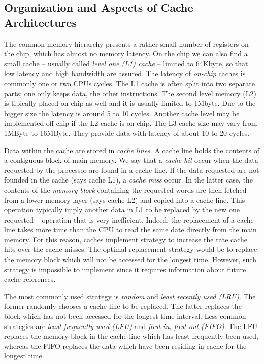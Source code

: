 \subsection{Organization and Aspects of Cache Architectures}
The common memory hierarchy presents a rather small number of registers on the chip, which has almost no memory latency. On the chip we can also find a small cache -- usually called \textit{level one (L1) cache} -- limited to 64Kbyte, so that low latency and high bandwidth are assured. The latency of \textit{on-chip} caches is commonly one or two CPUs cycles. The L1 cache is often split into two separate parts; one only keeps data, the other instructions. The second level memory (L2) is tipically placed on-chip as well and it is usually limited to 1Mbyte. Due to the bigger size the  latency is around 5 to 10 cycles. Another cache level may be implemented off-chip if the L2 cache is on-chip. The L3 cache size may vary from 1MByte to 16MByte. They provide data with latency of about 10 to 20 cycles.

Data within the cache are stored in \textit{cache lines}. A cache line holds the contents of a contiguous block of main memory. We say that a \textit{cache hit} occur when the data requested by the processor are found in a cache line. If the data requested are not founded in the cache (says cache L1), a \textit{cache miss} occur. In the latter case, the contents of the \textit{memory block} containing the requested words are then fetched from a lower memory layer (says cache L2) and copied into a cache line. This operation typically imply another data in L1 to be replaced by the new one requested -- operation that is very inefficient. Indeed, the replacement of a cache line takes more time than the CPU to read the same date directly from the main memory. For this reason, caches implement strategy to increase the rate cache hits  over the cache misses. The optimal replacement strategy would be to replace the memory block which will not be accessed for the longest time. However, such strategy is impossible to implement since it requires information about future cache references. 

The most commonly used strategy is \textit{random} and \textit{least recently used (LRU)}. The former randomly chooses a cache line to be replaced. The latter replaces the block which has not been accessed for the longest time interval. Less common strategies are \textit{least frequently used (LFU)} and \textit{first in, first out (FIFO)}. The LFU replaces the memory block in the cache line which has least frequently been used, whereas the FIFO replaces the data which have been residing in cache for the longest time.

